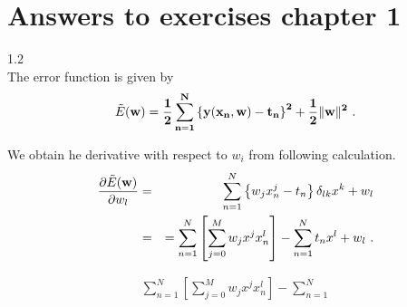 \section{Answers to exercises chapter 1}
1.2 \\
The error function is given by
\begin{eqnarray}
 \tilde{E}(\bf{w}) = \frac{1}{2} \sum_{n=1}^N
  \left \{
   y(x_n, \bf{w}) - t_n
  \right \}^2 + \frac{1}{2} \| \bf{w} \|^2 \ .
\end{eqnarray}

We obtain he derivative with respect to $w_i$ from following calculation.
\begin{eqnarray}
 \frac{\partial \tilde{E}(\bf{w})}{\partial w_l}
 &=&
  \sum_{n=1}^{N}
  \left \{
   w_j x_n^j - t_n
   \right \} \delta_{lk} x^k + w_l \\
 &=&
  = \sum_{n=1}^N
  \left [
   \sum_{j=0}^M w_j x^j x_n^l
          \right ]
          - \sum_{n=1}^N t_n x^l + w_l \ .
\end{eqnarray}

\begin{eqnarray}
 \sum_{n=1}^N
  \left [
   \sum_{j=0}^M w_j x^j x_n^l
\right ] - \sum_{n=1}^N
\end{eqnarray}
